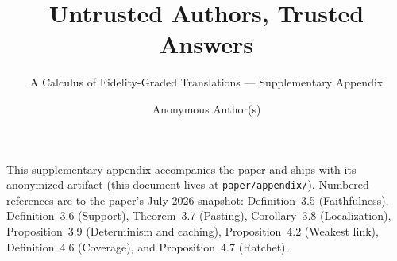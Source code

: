 \documentclass[sigplan,nonacm,anonymous,10pt]{acmart}
\begin{document}
\title{Untrusted Authors, Trusted Answers}
\subtitle{A Calculus of Fidelity-Graded Translations ---
  Supplementary Appendix}

\author{Anonymous Author(s)}

\maketitle

\noindent This supplementary appendix accompanies the paper and ships
with its anonymized artifact (this document lives at
\texttt{paper/appendix/}). Numbered references are to the paper's July
2026 snapshot: Definition~3.5 (Faithfulness), Definition~3.6 (Support),
Theorem~3.7 (Pasting), Corollary~3.8 (Localization), Proposition~3.9
(Determinism and caching), Proposition~4.2 (Weakest link),
Definition~4.6 (Coverage), and Proposition~4.7 (Ratchet).

\appendix


\end{document}
